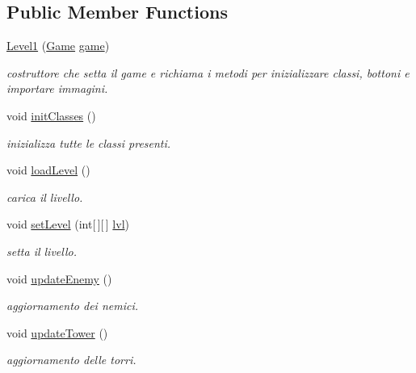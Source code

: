\subsection*{Public Member Functions}
\begin{DoxyCompactItemize}
\item 
\hyperlink{classscenes_1_1_level1_a0662011b3c0aa5d7dd21ce7cf353c3a0}{Level1} (\hyperlink{classprogetto_1_1_game}{Game} \hyperlink{classscenes_1_1_game_scene_ac6a5ed6191fcf3a5bf0445921feb4f48}{game})
\begin{DoxyCompactList}\small\item\em costruttore che setta il game e richiama i metodi per inizializzare classi, bottoni e importare immagini. \end{DoxyCompactList}\item 
void \hyperlink{classscenes_1_1_level1_afe125d345675ffefe8da7e96d39773f3}{init\+Classes} ()
\begin{DoxyCompactList}\small\item\em inizializza tutte le classi presenti. \end{DoxyCompactList}\item 
void \hyperlink{classscenes_1_1_level1_a286931cc46e197f4a85af7229fdc29a4}{load\+Level} ()
\begin{DoxyCompactList}\small\item\em carica il livello. \end{DoxyCompactList}\item 
void \hyperlink{classscenes_1_1_level1_afdd7363804bf6696ce4a46d6448844ed}{set\+Level} (int\mbox{[}$\,$\mbox{]}\mbox{[}$\,$\mbox{]} \hyperlink{classscenes_1_1_level1_a4b06a2210cf5b93dda77f2a9a061d538}{lvl})
\begin{DoxyCompactList}\small\item\em setta il livello. \end{DoxyCompactList}\item 
void \hyperlink{classscenes_1_1_level1_af005ec68c869a6acd5e833cba9330a50}{update\+Enemy} ()
\begin{DoxyCompactList}\small\item\em aggiornamento dei nemici. \end{DoxyCompactList}\item 
void \hyperlink{classscenes_1_1_level1_ae4fd4a959e4d782a5e7ac0eff77ba27f}{update\+Tower} ()
\begin{DoxyCompactList}\small\item\em aggiornamento delle torri. \end{DoxyCompactList}\item 

\end{DoxyCompactItemize}
